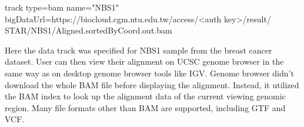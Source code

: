 \begin{CVerbatim}[fontsize=\small]
track type=bam name="NBS1"
bigDataUrl=https://biocloud.cgm.ntu.edu.tw/access/<auth key>/result/
STAR/NBS1/Aligned.sortedByCoord.out.bam
\end{CVerbatim}

\vspace{-1em}\noindent
Here the data track was specified for NBS1 sample from the breast cancer
dataset. User can then view their alignment on UCSC genome browser in the same
way as on desktop genome browser tools like IGV. Genome browser didn't download
the whole BAM file before displaying the alignment. Instead, it utilized the
BAM index to look up the alignment data of the current viewing genomic region.
Many file formats other than BAM are supported, including GTF and VCF.






